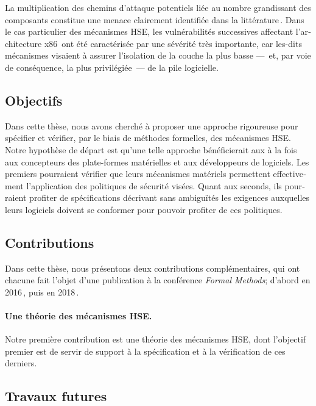 \begin{otherlanguage}{french}
  La multiplication des chemins d’attaque potentiels liée au nombre grandissant
  des composants constitue une menace clairement identifiée dans la
  littérature\,\cite{wing2003compositionalattack}.
  Dans le cas particulier des mécanismes HSE, les vulnérabilités successives
  affectant l’architecture
  x86\,\cite{duflot2009smram,wojtczuk2009smram,domas2015sinkhole,kallenberg2015racecondition,kovah2015senter}
  ont été caractérisée par une sévérité très importante, car les-dits mécanismes
  visaient à assurer l’isolation de la couche la plus basse ---~et, par voie de
  conséquence, la plus privilégiée~--- de la pile logicielle.

  \subsection{Objectifs}

  Dans cette thèse, nous avons cherché à proposer une approche rigoureuse pour
  spécifier et vérifier, par le biais de méthodes formelles, des mécanismes HSE.
  Notre hypothèse de départ est qu’une telle approche bénéficierait aux à la
  fois aux concepteurs des plate-formes matérielles et aux développeurs de
  logiciels.
  Les premiers pourraient vérifier que leurs mécanismes matériels permettent
  effectivement l’application des politiques de sécurité visées.
  Quant aux seconds, ils pourraient profiter de spécifications décrivant sans
  ambiguïtés les exigences auxquelles leurs logiciels doivent se conformer pour
  pouvoir profiter de ces politiques.

  \subsection{Contributions}

  Dans cette thèse, nous présentons deux contributions complémentaires, qui ont
  chacune fait l’objet d’une publication à la conférence \emph{Formal Methods};
  d’abord en 2016\,\cite{letan2016speccert}, puis en
  2018\,\cite{letan2018freespec}.

  \paragraph{Une théorie des mécanismes HSE.}
  Notre première contribution est une théorie des mécanismes HSE, dont
  l’objectif premier est de servir de support à la spécification et à la
  vérification de ces derniers.

  \subsection{Travaux futures}
\end{otherlanguage}

